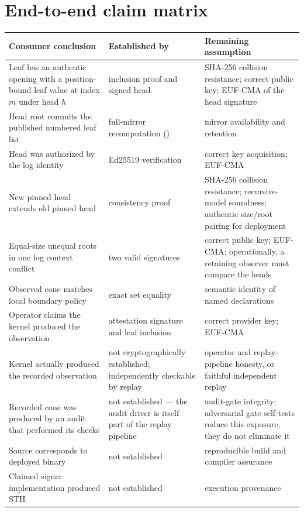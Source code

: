\documentclass[11pt]{article}
\theoremstyle{remark}
\newcommand{\code}[1]{\texttt{\detokenize{#1}}}
\begin{document}
\section{End-to-end claim matrix}\label{app:matrix}
\begin{center}\small
\begin{tabularx}{\textwidth}{@{}>{\raggedright\arraybackslash}X>{\raggedright\arraybackslash}X>{\raggedright\arraybackslash}X@{}}
\toprule
Consumer conclusion & Established by & Remaining assumption \\
\midrule
Leaf has an authentic opening with a position-bound leaf value at index $m$ under head $h$ & inclusion proof and signed head & \mbox{SHA-256} collision resistance; correct public key; \mbox{EUF-CMA} of the head signature \\
\addlinespace[3pt]
Head root commits the published numbered leaf list & full-mirror recomputation (\code{verify.py --all}) & mirror availability and retention \\
\addlinespace[3pt]
Head was authorized by the log identity & Ed25519 verification & correct key acquisition; \mbox{EUF-CMA} \\
\addlinespace[3pt]
New pinned head extends old pinned head & consistency proof & \mbox{SHA-256} collision resistance; recursive-model soundness; authentic size/root pairing for deployment \\
\addlinespace[3pt]
Equal-size unequal roots in one log context conflict & two valid signatures & correct public key; \mbox{EUF-CMA}; operationally, a retaining observer must compare the heads \\
\addlinespace[3pt]
Observed cone matches local boundary policy & exact set equality & semantic identity of named declarations \\
\addlinespace[3pt]
Operator claims the kernel produced the observation & attestation signature and leaf inclusion & correct provider key; \mbox{EUF-CMA} \\
\addlinespace[3pt]
Kernel actually produced the recorded observation & not cryptographically established; independently checkable by replay & operator and replay-pipeline honesty, or faithful independent replay \\
\addlinespace[3pt]
Recorded cone was produced by an audit that performed its checks & not established --- the audit driver is itself part of the replay pipeline & audit-gate integrity; adversarial gate self-tests reduce this exposure, they do not eliminate it \\
\addlinespace[3pt]
Source corresponds to deployed binary & not established & reproducible build and compiler assurance \\
\addlinespace[3pt]
Claimed signer implementation produced STH & not established & execution provenance \\
\bottomrule
\end{tabularx}
\end{center}
\end{document}
